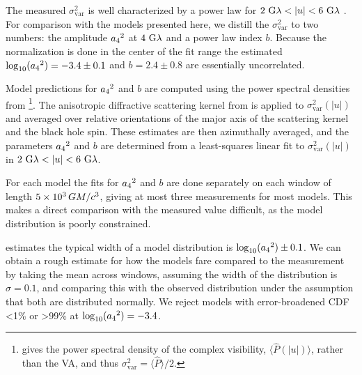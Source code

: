 The measured $\sigma_\text{var}^2$ is well characterized by a power law for $2~{\rm G}\lambda < |u| < 6~{\rm G}\lambda$ \citep{Georgiev_2022}.
For comparison with the models presented here, we distill the $\sigma_{\text{var}}^2$ to two numbers: the amplitude ${a_4}^2$ at $4~{\rm G}\lambda$ and a power law index $b$.
Because the normalization is done in the center of the fit range the estimated $\log_{10}({a_4}^2) = -3.4 \pm 0.1$ and $b=2.4\pm0.8$ are essentially uncorrelated.

Model predictions for ${a_4}^2$ and $b$ are computed using the power spectral densities from \citet{Georgiev_2022}\footnote{\citet{Georgiev_2022} gives the power spectral density of the complex visibility, $\langle\hat{P}(|u|)\rangle$, rather than the VA, and thus $\sigma_\text{var}^2=\langle \hat{P}\rangle/2$.}.
The anisotropic diffractive scattering kernel from \citet{Johnson_2018} is applied to $\sigma_\text{var}^2(|u|)$ and averaged over relative orientations of the major axis of the scattering kernel and the black hole spin.
These estimates are then azimuthally averaged, and the parameters ${a_4}^2$ and $b$ are determined from a least-squares linear fit to $\sigma_\text{var}^2(|u|)$ in $2~{\rm G}\lambda < |u| < 6~{\rm G}\lambda$.

For each model the fits for ${a_4}^2$ and $b$ are done separately on each window of length $5 \times 10^3\,GM/c^3$, giving at most three measurements for most models.
This makes a direct comparison with the measured value difficult, as the model distribution is poorly constrained.

\citet{Georgiev_2022} estimates the typical width of a model distribution is $\log_{10}({a_4}^2) \pm 0.1$.
We can obtain a rough estimate for how the models fare compared to the measurement by taking the mean across windows, assuming the width of the distribution is $\sigma = 0.1$, and comparing this with the observed distribution under the assumption that both are distributed normally.
We reject models with error-broadened CDF <1\% or >99\% at $\log_{10}({a_4}^2) = -3.4$.
